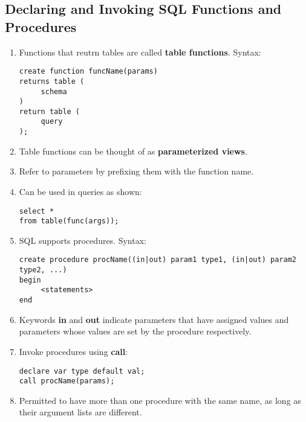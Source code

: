 \documentclass[journal,12pt,twocolumn]{IEEEtran}
\begin{document}
\subsection{Declaring and Invoking SQL Functions and Procedures}
\begin{enumerate}
     \item Functions that reutrn tables are called \textbf{table functions}. Syntax:
     \begin{lstlisting}
create function funcName(params)
returns table (
     schema
)
return table (
     query
);
     \end{lstlisting}
     \item Table functions can be thought of as \textbf{parameterized views}.
     \item Refer to parameters by prefixing them with the function name.
     \item Can be used in queries as shown:
     \begin{lstlisting}
select *
from table(func(args));
     \end{lstlisting}
     \item SQL supports procedures. Syntax:
     \begin{lstlisting}
create procedure procName((in|out) param1 type1, (in|out) param2 type2, ...)
begin
     <statements>
end
     \end{lstlisting}
     \item Keywords \textbf{in} and \textbf{out} indicate parameters that have
     assigned values and parameters whose values are set by the procedure
     respectively.
     \item Invoke procedures using \textbf{call}:
     \begin{lstlisting}
declare var type default val;
call procName(params);
     \end{lstlisting}
     \item Permitted to have more than one procedure with the same name, as long 
     as their argument lists are different.
\end{enumerate}
\end{document}
